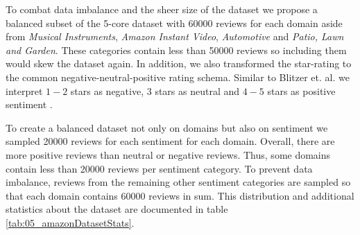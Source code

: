 To combat data imbalance and the sheer size of the dataset we propose a balanced subset of the 5-core dataset with 60000 reviews for each domain aside from \textit{Musical Instruments}, \textit{Amazon Instant Video}, \textit{Automotive} and \textit{Patio, Lawn and Garden}. These categories contain less than 50000 reviews so including them would skew the dataset again. In addition, we also transformed the star-rating to the common negative-neutral-positive rating schema. Similar to Blitzer et. al. we interpret $1-2$ stars as negative, 3 stars as neutral and $4-5$ stars as positive sentiment \cite{Blitzer2007}.

To create a balanced dataset not only on domains but also on sentiment we sampled 20000 reviews for each sentiment for each domain. Overall, there are more positive reviews than neutral or negative reviews. Thus, some domains contain less than 20000 reviews per sentiment category. To prevent data imbalance, reviews from the remaining other sentiment categories are sampled so that each domain contains 60000 reviews in sum. This distribution and additional statistics about the dataset are documented in table \ref{tab:05_amazonDatasetStats}.
